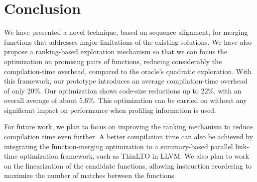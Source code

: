 \vspace{-1ex}
\section{Conclusion}

We have presented a novel technique, based on sequence alignment, for merging
functions that addresses major limitations of the existing solutions.
We have also propose a ranking-based exploration mechanism so that we can focus
the optimization on promising pairs of functions, reducing considerably the
compilation-time overhead, compared to the oracle's quadratic exploration.
With this framework, our prototype introduces an average
compilation-time overhead of only 20\%.
Our optimization shows code-size reductions up to 22\%, with an overall average
of about 5.6\%.
This optimization can be carried on without any significant impact on
performance when profiling information is used.


For future work, we plan to focus on improving the ranking mechanism to reduce
compilation time even further.
A better compilation time can also be achieved by integrating the
function-merging optimization to a summary-based parallel link-time optimization
framework, such as ThinLTO in LLVM.
We also plan to work on the linearization of the candidate functions, allowing
instruction reordering to maximize the number of matches between the functions.


